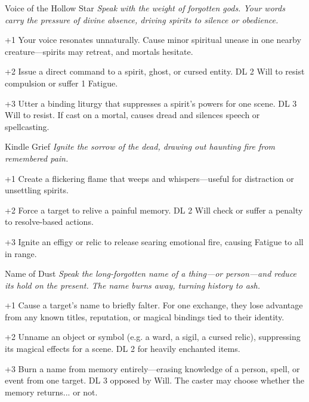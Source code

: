 \begin{WyrdSpell}[Divine]{Voice of the Hollow Star}\label{spell:voice-of-the-hollow-star}
    \textit{Speak with the weight of forgotten gods. Your words carry the pressure of divine absence, driving spirits to silence or obedience.}
    
    \begin{WyrdSpellBlock}
        \item[+1] Your voice resonates unnaturally. Cause minor spiritual unease in one nearby creature—spirits may retreat, and mortals hesitate.
        \item[+2] Issue a direct command to a spirit, ghost, or cursed entity. DL 2 Will to resist compulsion or suffer 1 Fatigue.
        \item[+3] Utter a binding liturgy that suppresses a spirit’s powers for one scene. DL 3 Will to resist. If cast on a mortal, causes dread and silences speech or spellcasting.
    \end{WyrdSpellBlock}
\end{WyrdSpell}
    

\begin{WyrdSpell}[Ashcraft]{Kindle Grief}\label{spell:kindle-grief}
\textit{Ignite the sorrow of the dead, drawing out haunting fire from remembered pain.}
    \begin{WyrdSpellBlock}
        \item[+1] Create a flickering flame that weeps and whispers—useful for distraction or unsettling spirits.
        \item[+2] Force a target to relive a painful memory. DL 2 Will check or suffer a penalty to resolve-based actions.
        \item[+3] Ignite an effigy or relic to release searing emotional fire, causing Fatigue to all in range.
    \end{WyrdSpellBlock}
\end{WyrdSpell}

\begin{WyrdSpell}[Ashcraft]{Name of Dust}\label{spell:name-of-dust}
    \textit{Speak the long-forgotten name of a thing—or person—and reduce its hold on the present. The name burns away, turning history to ash.}
    
    \begin{WyrdSpellBlock}
        \item[+1] Cause a target’s name to briefly falter. For one exchange, they lose advantage from any known titles, reputation, or magical bindings tied to their identity.
        
        \item[+2] Unname an object or symbol (e.g. a ward, a sigil, a cursed relic), suppressing its magical effects for a scene. DL 2 for heavily enchanted items.
        
        \item[+3] Burn a name from memory entirely—erasing knowledge of a person, spell, or event from one target. DL 3 opposed by Will. The caster may choose whether the memory returns... or not.
    \end{WyrdSpellBlock}
\end{WyrdSpell}

